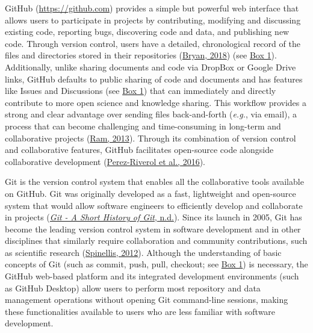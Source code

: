GitHub (\url{https://github.com}) provides a simple but powerful web interface that allows users to participate in projects by contributing, modifying and discussing existing code, reporting bugs, discovering code and data, and publishing new code.
Through version control, users have a detailed, chronological record of the files and directories stored in their repositories (\protect\hyperlink{ref-RVetqmsg}{Bryan, 2018}) (see \protect\hyperlink{definitions}{Box 1}).
Additionally, unlike sharing documents and code via DropBox or Google Drive links, GitHub defaults to public sharing of code and documents and has features like Issues and Discussions (see \protect\hyperlink{definitions}{Box 1}) that can immediately and directly contribute to more open science and knowledge sharing.
This workflow provides a strong and clear advantage over sending files back-and-forth (\emph{e.g.}, via email), a process that can become challenging and time-consuming in long-term and collaborative projects (\protect\hyperlink{ref-4ny1onB0}{Ram, 2013}).
Through its combination of version control and collaborative features, GitHub facilitates open-source code alongside collaborative development (\protect\hyperlink{ref-kEX5dgzK}{Perez-Riverol et al., 2016}).

Git is the version control system that enables all the collaborative tools available on GitHub.
Git was originally developed as a fast, lightweight and open-source system that would allow software engineers to efficiently develop and collaborate in projects (\protect\hyperlink{ref-1CM2EcdVk}{\emph{Git - A Short History of Git}, n.d.}).
Since its launch in 2005, Git has become the leading version control system in software development and in other disciplines that similarly require collaboration and community contributions, such as scientific research (\protect\hyperlink{ref-7q3wZN6d}{Spinellis, 2012}).
Although the understanding of basic concepts of Git (such as commit, push, pull, checkout; see \protect\hyperlink{definitions}{Box 1}) is necessary, the GitHub web-based platform and its integrated development environments (such as GitHub Desktop) allow users to perform most repository and data management operations without opening Git command-line sessions, making these functionalities available to users who are less familiar with software development.

